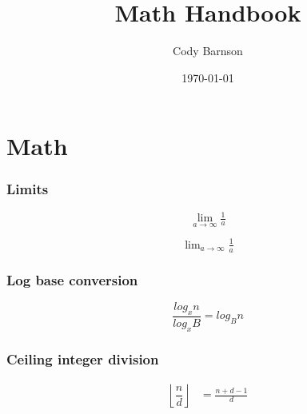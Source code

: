 \documentclass{article}
\begin{document}
\title{Math Handbook}
\author{Cody Barnson}
\date{\today}
\maketitle
\tableofcontents

\renewcommand\listoflistingscaption{Code segments}


\renewcommand\listingscaption{Code snippet}

{}




\section{Math}

\subsubsection{Limits}
\begin{equation}
    \lim_{a\to \infty} \tfrac{1}{a}
\end{equation}


\begin{equation}
    \lim\nolimits_{a\to \infty} \tfrac{1}{a}
\end{equation}

\subsubsection{Log base conversion}
\begin{equation*}
    \frac{log_xn}{log_xB} = log_Bn
\end{equation*}

\subsubsection{Ceiling integer division}
\begin{align*}
    \left\lfloor\dfrac{n}{d}\right\rfloor & = \frac{n + d - 1}{d} \\
\end{align*}
\end{document}
